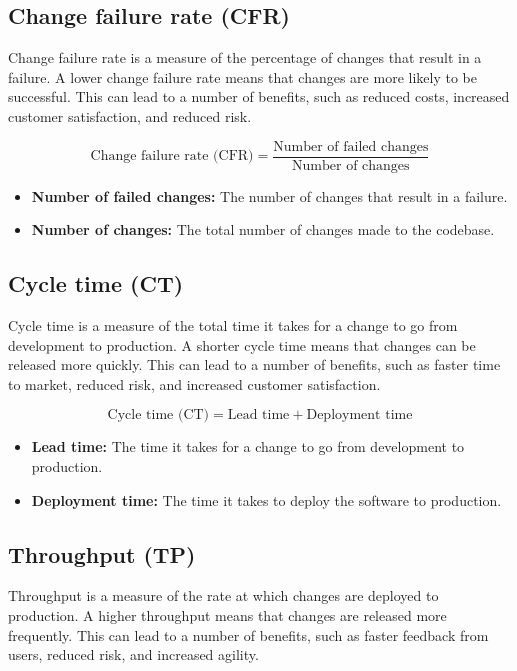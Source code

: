 \documentclass[12pt, letterpaper]{article}
\begin{document}
\subsection{Change failure rate (CFR)}
Change failure rate is a measure of the percentage of changes that result in a failure. A lower change failure rate means that changes are more likely to be successful. This can lead to a number of benefits, such as reduced costs, increased customer satisfaction, and reduced risk\cite{THEUNISSEN2022106733}.

\begin{equation}
\text{Change failure rate (CFR)} = \frac{\text{Number of failed changes}}{\text{Number of changes}}
\end{equation}

\begin{itemize}
    \item \textbf{Number of failed changes:} The number of changes that result in a failure.
    \item \textbf{Number of changes:} The total number of changes made to the codebase.
\end{itemize}


\subsection{Cycle time (CT)}
Cycle time is a measure of the total time it takes for a change to go from development to production. A shorter cycle time means that changes can be released more quickly. This can lead to a number of benefits, such as faster time to market, reduced risk, and increased customer satisfaction\cite{Teixeira}.

\begin{equation}
\text{Cycle time (CT)} = \text{Lead time} + \text{Deployment time}
\end{equation}

\begin{itemize}
    \item \textbf{Lead time:} The time it takes for a change to go from development to production.
    \item \textbf{Deployment time:} The time it takes to deploy the software to production.
\end{itemize}


\subsection{Throughput (TP)}
Throughput is a measure of the rate at which changes are deployed to production. A higher throughput means that changes are released more frequently. This can lead to a number of benefits, such as faster feedback from users, reduced risk, and increased agility\cite{Ghantous}.
\end{document}
